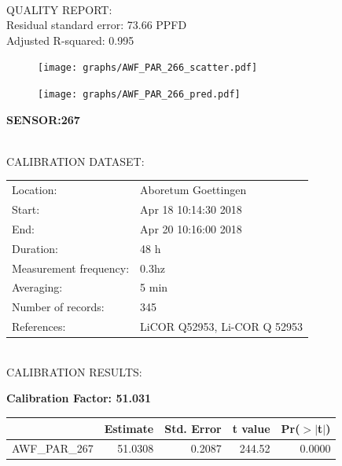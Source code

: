 \documentclass[oneside]{report}
\begin{document}
\hrulefill\\
QUALITY REPORT:\\
Residual standard error: 73.66 PPFD\\
Adjusted R-squared: 0.995



\begin{figure}[H]
  \centering
  \texttt{[image: graphs/AWF\_PAR\_266\_scatter.pdf]}
\end{figure}




\begin{figure}[H]
  \centering
  \texttt{[image: graphs/AWF\_PAR\_266\_pred.pdf]}
\end{figure}

\pagebreak


\begin{center}
\large{\textbf{SENSOR:267}}\\
\end{center}

\hrulefill\\
CALIBRATION DATASET:\\
\begin{table}[h!]
  \centering
  \label{tab:table1}
  \begin{tabular}{ll}
    Location: & Aboretum Goettingen\\ 
    
    
    Start:  & Apr 18 10:14:30 2018 \\
    End:   & Apr 20 10:16:00 2018\\ 
    Duration: & 48 h\\
    Measurement frequency: & 0.3hz\\
    Averaging:  &5 min\\
    Number of records: & 345 \\
    References: & LiCOR Q52953, Li-COR Q 52953 \\
  \end{tabular}
\end{table}

\hrulefill\\
CALIBRATION RESULTS:\\


\begin{center}
\textbf{\large{Calibration Factor: 51.031}}\\
\end{center}
\begin{table}[ht]
\centering
\begin{tabular}{rrrrr}
  \hline
 & Estimate & Std. Error & t value & Pr($>$$|$t$|$) \\ 
  \hline
AWF\_PAR\_267 & 51.0308 & 0.2087 & 244.52 & 0.0000 \\ 
   \hline
\end{tabular}
\end{table}
\end{document}
